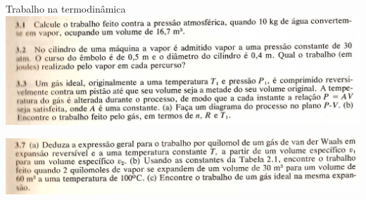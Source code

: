 \documentclass[t,%
brazilian,%
11pt,%
aspectratio=169,%
table%
]{beamer}
\begin{document}

\begin{frame}{Trabalho na termodinâmica}
    \centering
    \includegraphics[width=\textwidth]{images/Captura de tela de 2023-04-17 13-42-39.png}

    \includegraphics[width=\textwidth]{images/Captura de tela de 2023-04-17 13-57-07.png}
\end{frame}
\end{document}
